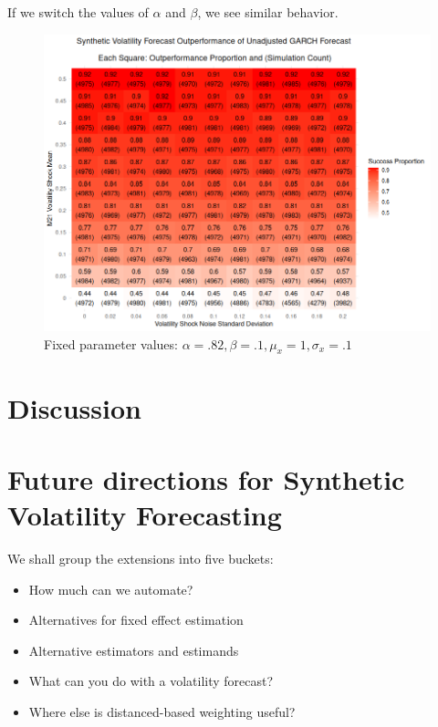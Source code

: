 \documentclass[9pt]{beamer}
\theoremstyle{definition}
\begin{document}
\begin{frame}
    \fontsize{8pt}{9pt}

    If we switch the values of $\alpha$ and $\beta$, we see similar behavior. 
    \begin{figure}[h!]
      \begin{center}
        \includegraphics[scale=.29]{simulation_plots/standard_simulation_alpha_.82_beta_.1.png}
        \caption{Fixed parameter values: $\alpha = .82, \beta = .1, \mu_{x} = 1, \sigma_{x} = .1$}
        \label{fig:heavy_alpha}
      \end{center}
      \end{figure}

\end{frame}

\section{Discussion}

\section{Future directions for Synthetic Volatility Forecasting}

\begin{frame}
We shall group the extensions into five buckets:
\begin{itemize}
    \item How much can we automate?
    \item Alternatives for fixed effect estimation
    \item Alternative estimators and estimands
    \item What can you do with a volatility forecast?
    \item Where else is distanced-based weighting useful?
\end{itemize}
\end{frame}
\end{document}
